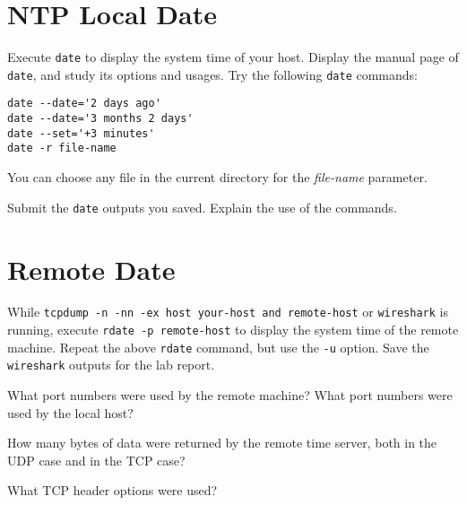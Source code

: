 \documentclass{../UTNetLab}
\begin{document}
\section{NTP Local Date}
    Execute \lstinline{date} to display the system time of your host. Display the manual page of \lstinline{date}, and study its options and usages.
    Try the following \lstinline{date} commands: 

    \begin{lstlisting}[emph={file-name}]
date --date='2 days ago'
date --date='3 months 2 days'
date --set='+3 minutes'
date -r file-name
    \end{lstlisting}
    You can choose any file in the current directory for the \textit{file-name} parameter.
    
    \begin{report}
    \item Submit the \lstinline{date} outputs you saved.
    Explain the use of the commands.
    \end{report}

\section{Remote Date}
    While \lstinline[emph={your-host, remote-host}]{tcpdump -n -nn -ex host your-host and remote-host} or \lstinline{wireshark} is running, execute \lstinline[emph={your-host, remote-host}]{rdate -p remote-host} to display the system time of the remote machine.
    Repeat the above \lstinline{rdate} command, but use the \lstinline{-u} option.
    Save the \lstinline{wireshark} outputs for the lab report.

    \begin{report}
    \item What port numbers were used by the remote machine?
    What port numbers were used by the local host?
    
    \item How many bytes of data were returned by the remote time server, both in the UDP case and in the TCP case?
    
    \item What TCP header options were used?
    \end{report}
\end{document}
